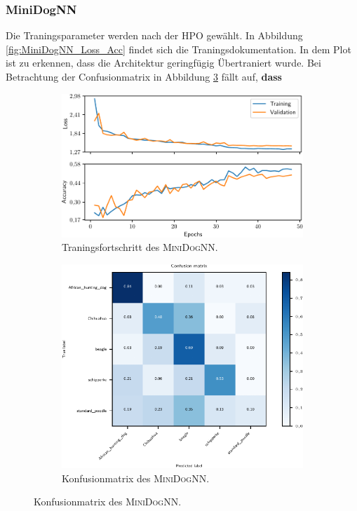 \subsubsection{MiniDogNN}
Die Traningsparameter werden nach der HPO gewählt.
In Abbildung \ref{fig:MiniDogNN_Loss_Acc} findet sich die Traningsdokumentation.
In dem Plot ist zu erkennen, dass die Architektur geringfügig Übertraniert
wurde.
Bei Betrachtung der Confusionmatrix in Abbildung \ref{fig:MiniDogNN_Konfusionmatrix} fällt auf, \textbf{dass}
\begin{figure}
\centering
\begin{subfigure}{0.48\textwidth}
\centering
\includegraphics[width = \textwidth]{../../final_data/MiniNN_n5/history.pdf}
\caption{Traningsfortschritt des \textsc{MiniDogNN}.}
\label{fig:MiniDog8NN_Loss_Acc}
\end{subfigure}
\begin{subfigure}{0.48\textwidth}
\centering
\includegraphics[width = \textwidth]{../../final_data/MiniNN_n5/confusion_matrix_mini.pdf}
\caption{Konfusionmatrix des \textsc{MiniDogNN}.}
\label{fig:MiniDogNN_Konfusionmatrix}
\end{subfigure}
\end{figure}
